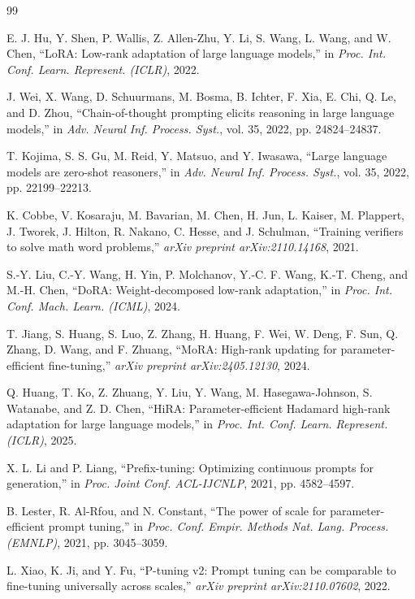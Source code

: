 \documentclass[a4paper,11pt]{article}
\begin{document}
\begin{thebibliography}{99}

E. J. Hu, Y. Shen, P. Wallis, Z. Allen-Zhu, Y. Li, S. Wang, L. Wang, and W. Chen, ``LoRA: Low-rank adaptation of large language models,'' in \emph{Proc. Int. Conf. Learn. Represent. (ICLR)}, 2022.

J. Wei, X. Wang, D. Schuurmans, M. Bosma, B. Ichter, F. Xia, E. Chi, Q. Le, and D. Zhou, ``Chain-of-thought prompting elicits reasoning in large language models,'' in \emph{Adv. Neural Inf. Process. Syst.}, vol. 35, 2022, pp. 24824--24837.

T. Kojima, S. S. Gu, M. Reid, Y. Matsuo, and Y. Iwasawa, ``Large language models are zero-shot reasoners,'' in \emph{Adv. Neural Inf. Process. Syst.}, vol. 35, 2022, pp. 22199--22213.

K. Cobbe, V. Kosaraju, M. Bavarian, M. Chen, H. Jun, L. Kaiser, M. Plappert, J. Tworek, J. Hilton, R. Nakano, C. Hesse, and J. Schulman, ``Training verifiers to solve math word problems,'' \emph{arXiv preprint arXiv:2110.14168}, 2021.

S.-Y. Liu, C.-Y. Wang, H. Yin, P. Molchanov, Y.-C. F. Wang, K.-T. Cheng, and M.-H. Chen, ``DoRA: Weight-decomposed low-rank adaptation,'' in \emph{Proc. Int. Conf. Mach. Learn. (ICML)}, 2024.

T. Jiang, S. Huang, S. Luo, Z. Zhang, H. Huang, F. Wei, W. Deng, F. Sun, Q. Zhang, D. Wang, and F. Zhuang, ``MoRA: High-rank updating for parameter-efficient fine-tuning,'' \emph{arXiv preprint arXiv:2405.12130}, 2024.

Q. Huang, T. Ko, Z. Zhuang, Y. Liu, Y. Wang, M. Hasegawa-Johnson, S. Watanabe, and Z. D. Chen, ``HiRA: Parameter-efficient Hadamard high-rank adaptation for large language models,'' in \emph{Proc. Int. Conf. Learn. Represent. (ICLR)}, 2025.

X. L. Li and P. Liang, ``Prefix-tuning: Optimizing continuous prompts for generation,'' in \emph{Proc. Joint Conf. ACL-IJCNLP}, 2021, pp. 4582--4597.

B. Lester, R. Al-Rfou, and N. Constant, ``The power of scale for parameter-efficient prompt tuning,'' in \emph{Proc. Conf. Empir. Methods Nat. Lang. Process. (EMNLP)}, 2021, pp. 3045--3059.

L. Xiao, K. Ji, and Y. Fu, ``P-tuning v2: Prompt tuning can be comparable to fine-tuning universally across scales,'' \emph{arXiv preprint arXiv:2110.07602}, 2022.


\end{thebibliography}
\end{document}
